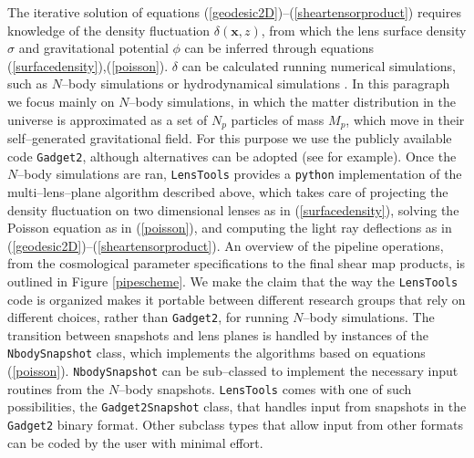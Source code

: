 \documentclass[5p]{elsarticle}
\newcommand{\bb}[1]{\mathbf{#1}}
\newcommand{\ttt}[1]{\texttt{#1}}
\newcommand{\LT}{\texttt{LensTools} }
\begin{document}
The iterative solution of equations (\ref{geodesic2D})--(\ref{sheartensorproduct}) requires knowledge of the density fluctuation $\delta(\bb{x},z)$, from which the lens surface density $\sigma$ and gravitational potential $\phi$ can be inferred through equations (\ref{surfacedensity}),(\ref{poisson}). $\delta$ can be calculated running numerical simulations, such as $N$--body simulations \citep{Gadget2,HACC} or hydrodynamical simulations \citep{Flash}. In this paragraph we focus mainly on $N$--body simulations, in which the matter distribution in the universe is approximated as a set of $N_p$ particles of mass $M_p$, which move in their self--generated gravitational field. For this purpose we use the publicly available code \ttt{Gadget2}\citep{Gadget2}, although alternatives can be adopted (see \citep{HACC} for example). Once the $N$--body simulations are ran, \LT provides a \ttt{python} implementation of the multi--lens--plane algorithm \citep{RayTracingHartlap} described above, which takes care of projecting the density fluctuation on two dimensional lenses as in (\ref{surfacedensity}), solving the Poisson equation as in (\ref{poisson}), and computing the light ray deflections as in (\ref{geodesic2D})--(\ref{sheartensorproduct}). An overview of the pipeline operations, from the cosmological parameter specifications to the final shear map products, is outlined in Figure \ref{pipescheme}. We make the claim that the way the \LT code is organized makes it portable between different research groups that rely on different choices, rather than \ttt{Gadget2}, for running $N$--body simulations. The transition between snapshots and lens planes is handled by instances of the \ttt{NbodySnapshot} class, which implements the algorithms based on equations (\ref{poisson}). \ttt{NbodySnapshot} can be sub--classed to implement the necessary input routines from the $N$--body snapshots. \LT comes with one of such possibilities, the \ttt{Gadget2Snapshot} class, that handles input from snapshots in the \ttt{Gadget2} binary format. Other subclass types that allow input from other formats can be coded by the user with minimal effort.  
\end{document}
